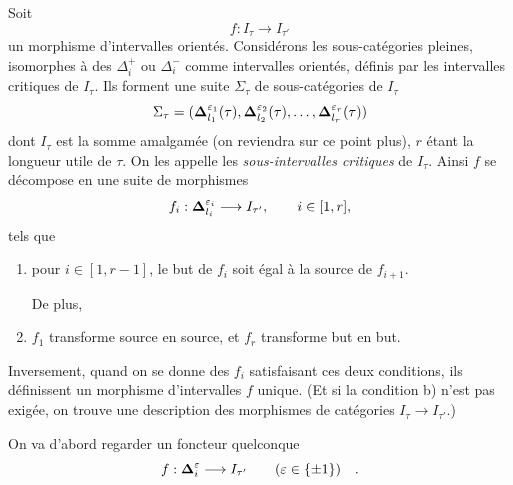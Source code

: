 Soit
\[
f : I_\tau\longrightarrow I_{\tau'}
\]
un morphisme d'intervalles orientés. Considérons les sous-catégories pleines, isomorphes à des $\Delta_i^+$ ou $\Delta_i^-$ comme intervalles orientés, définis par les intervalles critiques de $I_\tau$. Ils forment une suite $\Sigma_\tau$ de sous-catégories de $I_\tau$
\[
\Sigma_\tau=(\boldsymbol{\Delta}^{\varepsilon_1}_{l_1}(\tau),\boldsymbol{\Delta}^{\varepsilon_2}_{l_2}(\tau),\ldots,\boldsymbol{\Delta}^{\varepsilon_r}_{l_r}(\tau))
\]
dont $I_\tau$ est la somme amalgamée (on reviendra sur ce point plus), $r$ étant la longueur utile de $\tau$. On les appelle les \textit{sous-intervalles critiques} de $I_\tau$. Ainsi $f$ se décompose en une suite de morphismes
\[
f_i : \boldsymbol{\Delta}^{\varepsilon_i}_{l_i}\longrightarrow I_{\tau'},\qquad i\in[1,r],
\]
tels que
\begin{enumerate}
\item[a)] pour $i\in[1,r-1]$, le but de $f_i$ soit égal à la source de $f_{i+1}$.

De plus,
\item[b)] $f_1$ transforme source en source, et $f_r$ transforme but en but.
\end{enumerate}

Inversement, quand on se donne des $f_i$ satisfaisant ces deux conditions, ils définissent un morphisme d'intervalles $f$ unique. (Et si la condition b) n'est pas exigée, on trouve une description des morphismes de catégories $I_\tau\longrightarrow I_{\tau'}$.)

On va d'abord regarder un foncteur quelconque
\[
f : \boldsymbol{\Delta}^{\varepsilon}_i\longrightarrow I_{\tau'}\qquad(\varepsilon\in\{\pm1\})\quad .
\]

